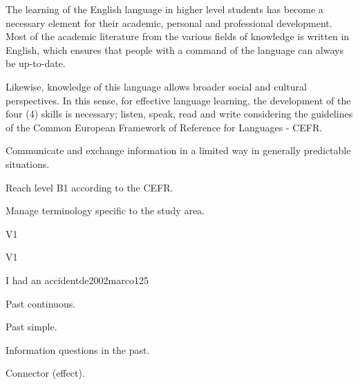 \begin{syllabus}


\begin{justification}
The learning of the English language in higher level students has become a necessary 
element for their academic, personal and professional development.
Most of the academic literature from the various fields of knowledge is written in English, 
which ensures that people with a command of the language can always be up-to-date.

Likewise, knowledge of this language allows broader social and cultural perspectives. 
In this sense, for effective language learning, the development of the four (4) 
skills is necessary; listen, speak, read and write considering the guidelines of the 
Common European Framework of Reference for Languages - CEFR.
\end{justification}

\begin{goals}
\item Communicate and exchange information in a limited way in generally predictable situations.
\item Reach level B1 according to the CEFR.
\item Manage terminology specific to the study area.
\end{goals}

\begin{outcomes}{V1}
\item {}
\end{outcomes}

\begin{competences}{V1}
    \item {}
\end{competences}

\begin{unit}{I had an accident}{}{de2002marco}{12}{5}
   \begin{topics}
      \item Past continuous.
      \item Past simple.
      \item Information questions in the past.
      \item Connector (effect).
   \end{topics}


\end{unit}
\end{syllabus}
